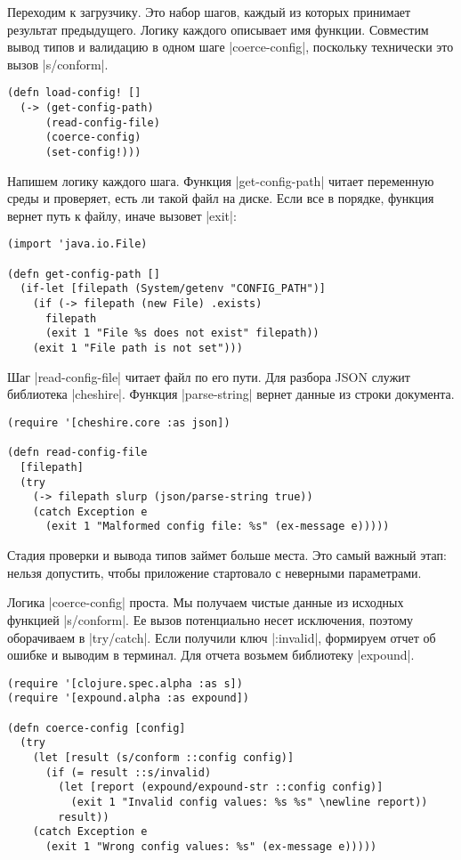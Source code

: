 Переходим к загрузчику. Это набор шагов, каждый из которых принимает результат
предыдущего. Логику каждого описывает имя функции. Совместим вывод типов и
валидацию в одном шаге \spverb|coerce-config|, поскольку технически это вызов
\spverb|s/conform|.

\begin{verbatim}
(defn load-config! []
  (-> (get-config-path)
      (read-config-file)
      (coerce-config)
      (set-config!)))
\end{verbatim}

Напишем логику каждого шага. Функция \spverb|get-config-path| читает переменную
среды и проверяет, есть ли такой файл на диске. Если все в порядке, функция
вернет путь к файлу, иначе вызовет \spverb|exit|:

\begin{verbatim}
(import 'java.io.File)

(defn get-config-path []
  (if-let [filepath (System/getenv "CONFIG_PATH")]
    (if (-> filepath (new File) .exists)
      filepath
      (exit 1 "File %s does not exist" filepath))
    (exit 1 "File path is not set")))
\end{verbatim}

Шаг \spverb|read-config-file| читает файл по его пути. Для разбора JSON служит
библиотека \spverb|cheshire|. Функция \spverb|parse-string| вернет данные из
строки документа.

\begin{verbatim}
(require '[cheshire.core :as json])

(defn read-config-file
  [filepath]
  (try
    (-> filepath slurp (json/parse-string true))
    (catch Exception e
      (exit 1 "Malformed config file: %s" (ex-message e)))))
\end{verbatim}

Стадия проверки и вывода типов займет больше места. Это самый важный этап:
нельзя допустить, чтобы приложение стартовало с неверными параметрами.

Логика \spverb|coerce-config| проста. Мы получаем чистые данные из исходных
функцией \spverb|s/conform|. Ее вызов потенциально несет исключения, поэтому
оборачиваем в \spverb|try/catch|. Если получили ключ \spverb|:invalid|,
формируем отчет об ошибке и выводим в терминал. Для отчета возьмем библиотеку
\spverb|expound|.

\begin{verbatim}
(require '[clojure.spec.alpha :as s])
(require '[expound.alpha :as expound])

(defn coerce-config [config]
  (try
    (let [result (s/conform ::config config)]
      (if (= result ::s/invalid)
        (let [report (expound/expound-str ::config config)]
          (exit 1 "Invalid config values: %s %s" \newline report))
        result))
    (catch Exception e
      (exit 1 "Wrong config values: %s" (ex-message e)))))
\end{verbatim}

